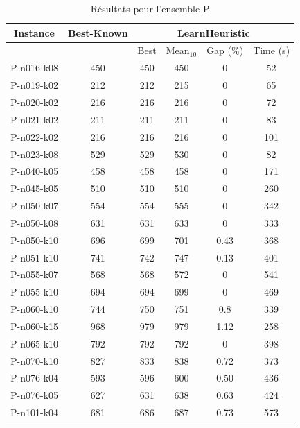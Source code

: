 \documentclass[a4paper,11pt]{article}%
\begin{document}
\begin{table}[h!]
\caption{Résultats pour l'ensemble P}
\label{TP}
\begin{center}
\begin{tabular}{|@{}c@{}|@{}c@{}|@{}c@{}|@{}c@{}|@{}c@{}|@{}c@{}|}

\hline
 Instance & Best-Known & \multicolumn{4}{c|}{LearnHeuristic}  \\
 \hline
 & & Best & Mean$_{10}$ & Gap (\%) & Time (s) \\ 
 \hline
 P-n016-k08 & 450 & 450 & 450 & 0 & 52  \\
 \hline
 P-n019-k02   & 212 & 212 & 215 & 0 & 65   \\
  \hline
   P-n020-k02 & 216 & 216 & 216 &0 & 72  \\
 \hline
   P-n021-k02 & 211 & 211 & 211 &0 & 83  \\
  \hline
   P-n022-k02 & 216 & 216 & 216 & 0 & 101  \\
 \hline
  P-n023-k08  & 529 & 529 & 530 & 0 & 82 \\
  \hline
  P-n040-k05 & 458 & 458 & 458 & 0 & 171 \\
 \hline
  P-n045-k05  & 510 & 510 & 510 & 0 & 260 \\
 \hline
 P-n050-k07 & 554 & 554 & 555 & 0 & 342 \\
 \hline
  P-n050-k08  & 631 & 631 & 633 & 0 & 333   \\
 \hline
   P-n050-k10 & 696 & 699 & 701 & 0.43 & 368   \\
  \hline
   P-n051-k10 & 741 & 742 & 747 & 0.13 & 401  \\
 \hline 
  P-n055-k07  & 568 & 568 & 572& 0 & 541  \\
  \hline
  P-n055-k10  & 694 & 694 & 699 &0 & 469  \\
  \hline
  P-n060-k10 & 744 & 750 & 751 & 0.8 & 339  \\
 \hline
   P-n060-k15  & 968 & 979 & 979 &1.12 & 258   \\
  \hline
  P-n065-k10  & 792 & 792 & 792 & 0 & 398   \\
  \hline
  P-n070-k10 & 827 & 833 & 838 & 0.72 & 373    \\
  \hline
  P-n076-k04 & 593 & 596 &600 & 0.50 & 436 \\
 \hline 
   P-n076-k05 & 627 & 631 & 638 &0.63 & 424   \\
  \hline 
  P-n101-k04  & 681 & 686 & 687 & 0.73 & 573  \\
  \hline
\end{tabular}
\end{center}
\end{table}
\end{document}
